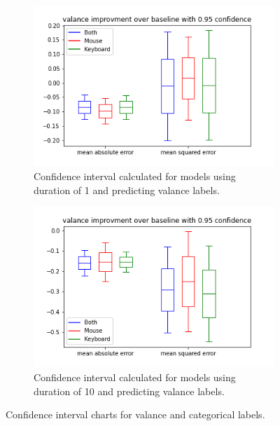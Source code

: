 \documentclass[../main.tex]{subfiles}
\begin{document}
\begin{figure}
\begin{subfigure}[b]{0.42\textwidth}
        \end{subfigure}
        \begin{subfigure}[b]{0.42\textwidth}
            \centering
            \includegraphics[width=\textwidth]{figures/results/1_valance_0.95.png}
            \captionsetup{justification=centering}
            \caption{Confidence interval calculated for models using duration of 1 and predicting valance labels.}
            \label{fig:val_1}
        \end{subfigure}
        \hfill
        \begin{subfigure}[b]{0.42\textwidth}
            \centering
            \includegraphics[width=\textwidth]{figures/results/10_valance_0.95.png}
            \captionsetup{justification=centering}
            \caption{Confidence interval calculated for models using duration of 10 and predicting valance labels.}
            \label{fig:val_10}
        \end{subfigure}
        \caption{Confidence interval charts for valance and categorical labels.}
        \label{fig:cat_val_5_10}
    \end{figure}
\end{document}
